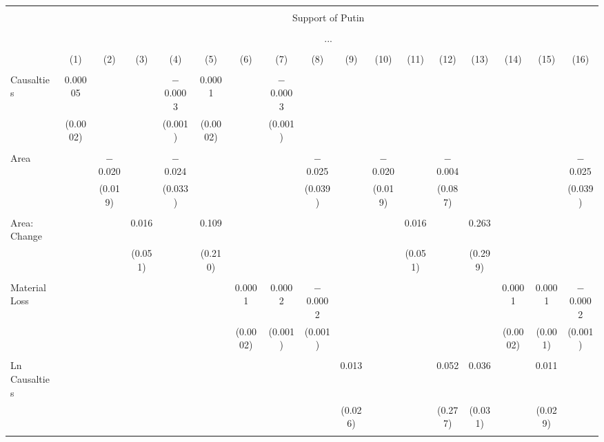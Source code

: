 
\begin{table}[!htbp] \centering 
  \caption{} 
  \label{} 
\begin{tabular}{@{\extracolsep{5pt}}lcccccccccccccccc} 
\\[-1.8ex]\hline 
\hline \\[-1.8ex] 
 & \multicolumn{16}{c}{Support of Putin} \\ 
\cline{2-17} 
\\[-1.8ex] & \multicolumn{16}{c}{...} \\ 
\\[-1.8ex] & (1) & (2) & (3) & (4) & (5) & (6) & (7) & (8) & (9) & (10) & (11) & (12) & (13) & (14) & (15) & (16)\\ 
\hline \\[-1.8ex] 
 Causalties & 0.00005 &  &  & $-$0.0003 & 0.0001 &  & $-$0.0003 &  &  &  &  &  &  &  &  &  \\ 
  & (0.0002) &  &  & (0.001) & (0.0002) &  & (0.001) &  &  &  &  &  &  &  &  &  \\ 
  & & & & & & & & & & & & & & & & \\ 
 Area &  & $-$0.020 &  & $-$0.024 &  &  &  & $-$0.025 &  & $-$0.020 &  & $-$0.004 &  &  &  & $-$0.025 \\ 
  &  & (0.019) &  & (0.033) &  &  &  & (0.039) &  & (0.019) &  & (0.087) &  &  &  & (0.039) \\ 
  & & & & & & & & & & & & & & & & \\ 
 Area: Change &  &  & 0.016 &  & 0.109 &  &  &  &  &  & 0.016 &  & 0.263 &  &  &  \\ 
  &  &  & (0.051) &  & (0.210) &  &  &  &  &  & (0.051) &  & (0.299) &  &  &  \\ 
  & & & & & & & & & & & & & & & & \\ 
 Material Loss &  &  &  &  &  & 0.0001 & 0.0002 & $-$0.0002 &  &  &  &  &  & 0.0001 & 0.0001 & $-$0.0002 \\ 
  &  &  &  &  &  & (0.0002) & (0.001) & (0.001) &  &  &  &  &  & (0.0002) & (0.001) & (0.001) \\ 
  & & & & & & & & & & & & & & & & \\ 
 Ln Causalties &  &  &  &  &  &  &  &  & 0.013 &  &  & 0.052 & 0.036 &  & 0.011 &  \\ 
  &  &  &  &  &  &  &  &  & (0.026) &  &  & (0.277) & (0.031) &  & (0.029) &  \\ 
  & & & & & & & & & & & & & & & & \\ 

\end{tabular}
\end{table}
